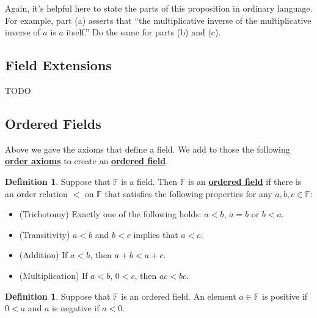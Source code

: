 \documentclass[11pt]{article}
\newenvironment{task}
	{\begin{mdframed}[linecolor=lightgray, linewidth=3pt]\raggedright}
	{\end{mdframed}}
\renewcommand\emph[1]{\underline{\bf{#1}}} %
\theoremstyle{definition}
\newtheorem{definition}[theorem]{Definition}
\begin{document}
\begin{task}
Again, it's helpful here to state the parts of this proposition in ordinary language. For example, part (a) asserts that ``the multiplicative inverse of
the multiplicative inverse of $a$ is $a$ itself.'' Do the same for parts (b) and (c).
\end{task}

\subsection{Field Extensions}

TODO

\subsection{Ordered Fields}

Above we gave the axioms that define a field. We add to those the following \emph{order axioms} to create an \emph{ordered field}.

\begin{definition} Suppose that $\mathbb{F}$ is a field. Then $\mathbb{F}$ is an \emph{ordered field} if there is an order
  relation $<$ on $\mathbb{F}$ that satisfies the following properties for any $a,b,c\in\mathbb{F}$:
\begin{itemize}
  \item (Trichotomy) Exactly one of the following holds: $a < b$, $a=b$ or $b < a$.
  \item (Transitivity) $a< b$ and $b < c$ implies that $a < c$.
  \item (Addition) If $a< b$, then $a+b < a+c$.
  \item (Multiplication) If $a < b$, $0 < c$, then $ac < bc$.
\end{itemize}
\end{definition}


\begin{definition}
  Suppose that $\mathbb{F}$ is an ordered field. An element $a\in\mathbb{F}$ is positive if $0 < a$ and $a$ is negative if $a < 0$.
\end{definition}
\end{document}
